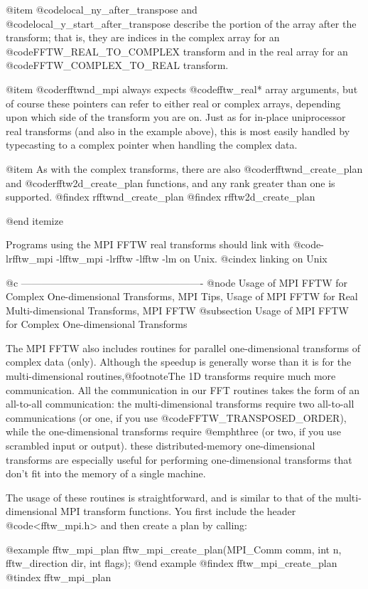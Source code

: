 @item
@code{local_ny_after_transpose} and @code{local_y_start_after_transpose}
describe the portion of the array after the transform; that is, they are
indices in the complex array for an @code{FFTW_REAL_TO_COMPLEX} transform
and in the real array for an @code{FFTW_COMPLEX_TO_REAL} transform.

@item
@code{rfftwnd_mpi} always expects @code{fftw_real*} array arguments, but
of course these pointers can refer to either real or complex arrays,
depending upon which side of the transform you are on.  Just as for
in-place uniprocessor real transforms (and also in the example above),
this is most easily handled by typecasting to a complex pointer when
handling the complex data.

@item
As with the complex transforms, there are also
@code{rfftwnd_create_plan} and @code{rfftw2d_create_plan} functions, and
any rank greater than one is supported.
@findex rfftwnd_create_plan
@findex rfftw2d_create_plan

@end itemize

Programs using the MPI FFTW real transforms should link with
@code{-lrfftw_mpi -lfftw_mpi -lrfftw -lfftw -lm} on Unix.
@cindex linking on Unix

@c -------------------------------------------------------
@node Usage of MPI FFTW for Complex One-dimensional Transforms, MPI Tips, Usage of MPI FFTW for Real Multi-dimensional Transforms, MPI FFTW
@subsection Usage of MPI FFTW for Complex One-dimensional Transforms

The MPI FFTW also includes routines for parallel one-dimensional
transforms of complex data (only).  Although the speedup is generally
worse than it is for the multi-dimensional routines,@footnote{The 1D
transforms require much more communication.  All the communication in
our FFT routines takes the form of an all-to-all communication: the
multi-dimensional transforms require two all-to-all communications (or
one, if you use @code{FFTW_TRANSPOSED_ORDER}), while the one-dimensional
transforms require @emph{three} (or two, if you use scrambled input or
output).} these distributed-memory one-dimensional transforms are
especially useful for performing one-dimensional transforms that don't
fit into the memory of a single machine.

The usage of these routines is straightforward, and is similar to that
of the multi-dimensional MPI transform functions.  You first include the
header @code{<fftw_mpi.h>} and then create a plan by calling:

@example
fftw_mpi_plan fftw_mpi_create_plan(MPI_Comm comm, int n, 
                                   fftw_direction dir, int flags);
@end example
@findex fftw_mpi_create_plan
@tindex fftw_mpi_plan

